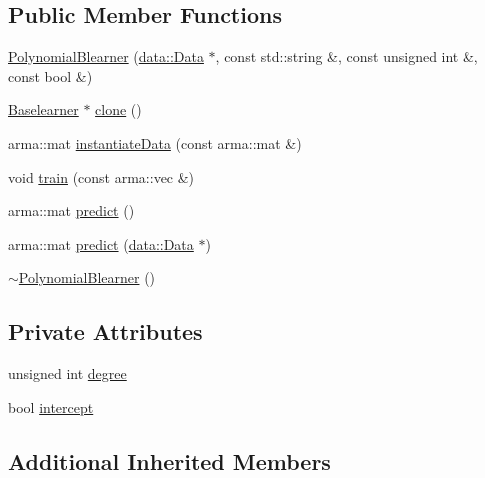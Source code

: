 \subsection*{Public Member Functions}
\begin{DoxyCompactItemize}
\item 
\mbox{\hyperlink{classblearner_1_1_polynomial_blearner_abc12720faabbad27d60d2dbdb006802e}{Polynomial\+Blearner}} (\mbox{\hyperlink{classdata_1_1_data}{data\+::\+Data}} $\ast$, const std\+::string \&, const unsigned int \&, const bool \&)
\item 
\mbox{\hyperlink{classblearner_1_1_baselearner}{Baselearner}} $\ast$ \mbox{\hyperlink{classblearner_1_1_polynomial_blearner_a4a93ace818c330e5d1f572108ba061c0}{clone}} ()
\item 
arma\+::mat \mbox{\hyperlink{classblearner_1_1_polynomial_blearner_a5d3a44e8a4a8155ac24ee05e2c68af75}{instantiate\+Data}} (const arma\+::mat \&)
\item 
void \mbox{\hyperlink{classblearner_1_1_polynomial_blearner_acf24025a73293a2569450dd4659e0997}{train}} (const arma\+::vec \&)
\item 
arma\+::mat \mbox{\hyperlink{classblearner_1_1_polynomial_blearner_a422569884414d31db5a2b770b22176c3}{predict}} ()
\item 
arma\+::mat \mbox{\hyperlink{classblearner_1_1_polynomial_blearner_ae321c17adaab23b0d27685920c2608af}{predict}} (\mbox{\hyperlink{classdata_1_1_data}{data\+::\+Data}} $\ast$)
\item 
\mbox{\hyperlink{classblearner_1_1_polynomial_blearner_ac3acf16e62db3dc6c34b4290f9f04f04}{$\sim$\+Polynomial\+Blearner}} ()
\end{DoxyCompactItemize}
\subsection*{Private Attributes}
\begin{DoxyCompactItemize}
\item 
unsigned int \mbox{\hyperlink{classblearner_1_1_polynomial_blearner_a7a522e19634367a4bfad2d6ea532ec44}{degree}}
\item 
bool \mbox{\hyperlink{classblearner_1_1_polynomial_blearner_af16d0f9f97179d9b23ec8796a0c74709}{intercept}}
\end{DoxyCompactItemize}
\subsection*{Additional Inherited Members}



